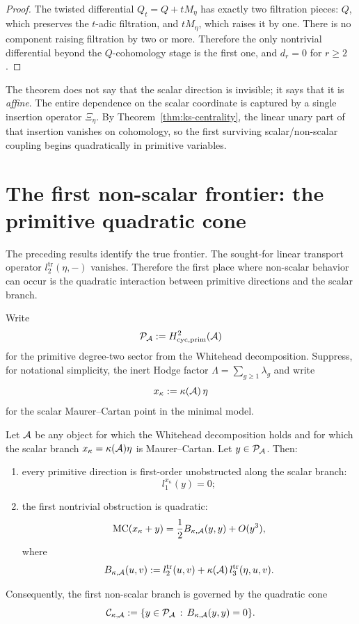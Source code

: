 \begin{proof}
The twisted differential $Q_t=Q+tM_\eta$ has exactly two filtration pieces:
$Q$, which preserves the $t$-adic filtration, and $tM_\eta$, which raises it by
one.  There is no component raising filtration by two or more.  Therefore the
only nontrivial differential beyond the $Q$-cohomology stage is the first one,
and $d_r=0$ for $r\ge 2$.\end{proof}

\begin{remark}
\label{rem:meaning-affine-normal-form}
The theorem does not say that the scalar direction is invisible; it says that it
is \emph{affine}.  The entire dependence on the scalar coordinate is captured by
a single insertion operator $\Xi_\eta$.  By Theorem~\ref{thm:ks-centrality}, the
linear unary part of that insertion vanishes on cohomology, so the first
surviving scalar/non-scalar coupling begins quadratically in primitive
variables.
\end{remark}

\section{The first non-scalar frontier: the primitive quadratic cone}
\label{sec:primitive-quadratic-cone}

The preceding results identify the true frontier.  The sought-for linear
transport operator $l_2^{\mathrm{tr}}(\eta,-)$ vanishes.  Therefore the first
place where non-scalar behavior can occur is the quadratic interaction between
primitive directions and the scalar branch.

\begin{notation}
\label{not:primitive-sector}
Write
\[
\mathcal{P}_{\mathcal{A}}:=H^2_{\mathrm{cyc,prim}}(\mathcal{A})
\]
for the primitive degree-two sector from the Whitehead decomposition.  Suppress,
for notational simplicity, the inert Hodge factor $\Lambda=\sum_{g\ge 1}\lambda_g$
and write
\[
x_\kappa:=\kappa(\mathcal{A})\,\eta
\]
for the scalar Maurer--Cartan point in the minimal model.
\end{notation}

\begin{theorem}
\label{thm:quadratic-frontier}
Let $\mathcal{A}$ be any object for which the Whitehead decomposition holds and for
which the scalar branch $x_\kappa=\kappa(\mathcal{A})\eta$ is Maurer--Cartan.  Let
$y\in \mathcal{P}_{\mathcal{A}}$.  Then:
\begin{enumerate}[label=\textup{(\alph*)}]
\item every primitive direction is first-order unobstructed along the scalar
branch:
\[
l_1^{x_\kappa}(y)=0;
\]
\item the first nontrivial obstruction is quadratic:
\[
\mathrm{MC}(x_\kappa+y)=\frac12 B_{\kappa,\mathcal{A}}(y,y)+O(y^3),
\]
where
\[
B_{\kappa,\mathcal{A}}(u,v):=l_2^{\mathrm{tr}}(u,v)+\kappa(\mathcal{A})\,l_3^{\mathrm{tr}}(\eta,u,v).
\]
\end{enumerate}
Consequently, the first non-scalar branch is governed by the quadratic cone
\[
\mathcal{C}_{\kappa,\mathcal{A}}:=\{y\in \mathcal{P}_{\mathcal{A}}\,:\,B_{\kappa,\mathcal{A}}(y,y)=0\}.
\]
\end{theorem}

